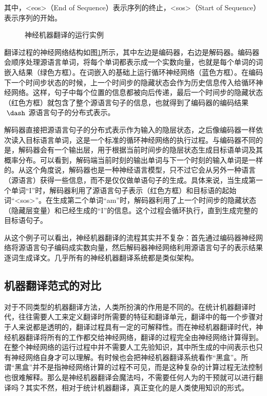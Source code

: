 \noindent 其中，<eos>（End of Sequence）表示序列的终止，<sos>（Start of Sequence）表示序列的开始。

\begin{figure}[htp]
\centering

\caption{神经机器翻译的运行实例}
\label{fig:6-7}
\end{figure}

\parinterval 翻译过程的神经网络结构如图\ref{fig:6-7}所示，其中左边是编码器，右边是解码器。编码器会顺序处理源语言单词，将每个单词都表示成一个实数向量，也就是每个单词的词嵌入结果（绿色方框）。在词嵌入的基础上运行循环神经网络（蓝色方框）。在编码下一个时间步状态的时候，上一个时间步的隐藏状态会作为历史信息传入给循环神经网络。这样，句子中每个位置的信息都被向后传递，最后一个时间步的隐藏状态（红色方框）就包含了整个源语言句子的信息，也就得到了编码器的编码结果$\ \dash\ $源语言句子的分布式表示。

\parinterval 解码器直接把源语言句子的分布式表示作为输入的隐层状态，之后像编码器一样依次读入目标语言单词，这是一个标准的循环神经网络的执行过程。与编码器不同的是，解码器会有一个输出层，用于根据当前时间步的隐层状态生成目标语单词及其概率分布。可以看到，解码端当前时刻的输出单词与下一个时刻的输入单词是一样的。从这个角度说，解码器也是一种神经语言模型，只不过它会从另外一种语言（源语言）获得一些信息，而不是仅仅做单语句子的生成。具体来说，当生成第一个单词``I''时，解码器利用了源语言句子表示（红色方框）和目标语的起始词``<sos>''。在生成第二个单词``am''时，解码器利用了上一个时间步的隐藏状态（隐藏层变量）和已经生成的``I''的信息。这个过程会循环执行，直到生成完整的目标语句子。

\parinterval 从这个例子可以看出，神经机器翻译的流程其实并不复杂：首先通过编码器神经网络将源语言句子编码成实数向量，然后解码器神经网络利用源语言句子的表示结果逐词生成译文。几乎所有的神经机器翻译系统都是类似架构。


\subsection{机器翻译范式的对比}

\parinterval 对于不同类型的机器翻译方法，人类所扮演的作用是不同的。在统计机器翻译时代，往往需要人工来定义翻译时所需要的特征和翻译单元，翻译中的每一个步骤对于人来说都是透明的，翻译过程具有一定的可解释性。而在神经机器翻译时代，神经机器翻译将所有的工作都交给神经网络，翻译的过程完全由神经网络计算得到。在整个神经网络的运行过程中并不需要人工先验知识，其中所生成的中间表示也只有神经网络自身才可以理解。有时候也会把神经机器翻译系统看作``黑盒''。所谓``黑盒''并不是指神经网络计算的过程不可见，而是这种复杂的计算过程无法控制也很难解释。那么是神经机器翻译会魔法吗，不需要任何人为的干预就可以进行翻译吗？其实不然，相对于统计机器翻译，真正变化的是人类使用知识的形式。

